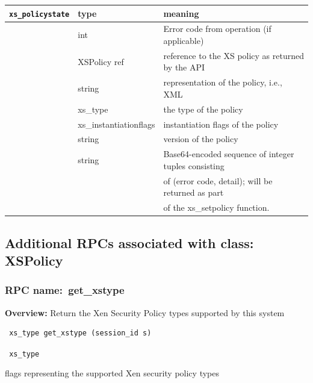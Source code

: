 \begin{longtable}{|l|l|l|}
\hline
{\tt xs\_policystate} & type & meaning \\
\hline
\hspace{0.5cm}{\tt xserr} & int & Error code from operation (if applicable) \\
\hspace{0.5cm}{\tt xs\_ref}  & XSPolicy ref & reference to the XS policy as returned by the API \\
\hspace{0.5cm}{\tt repr} & string & representation of the policy, i.e., XML \\
\hspace{0.5cm}{\tt type} & xs\_type & the type of the policy \\
\hspace{0.5cm}{\tt flags } & xs\_instantiationflags  & instantiation flags of the policy \\
\hspace{0.5cm}{\tt version} & string & version of the policy \\
\hspace{0.5cm}{\tt errors} & string & Base64-encoded sequence of integer tuples consisting \\
& & of (error code, detail); will be returned as part  \\
& & of the xs\_setpolicy function. \\
\hline
\end{longtable}

\subsection{Additional RPCs associated with class: XSPolicy}
\subsubsection{RPC name:~get\_xstype}

{\bf Overview:}
Return the Xen Security Policy types supported by this system

\begin{verbatim} xs_type get_xstype (session_id s)\end{verbatim}

{\tt
xs\_type
}

flags representing the supported Xen security policy types
 \vspace{0.3cm}
\vspace{0.3cm}
\vspace{0.3cm}

